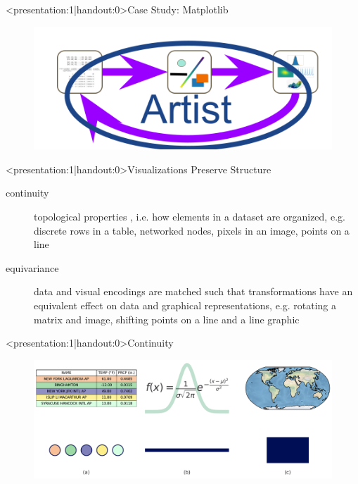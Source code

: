 \documentclass[xcolor={dvipsnames}, handout]{beamer}
\begin{document}
\begin{frame}<presentation:1|handout:0>{Case Study: Matplotlib}
    \begin{figure}
       \includegraphics[width=\linewidth]{figures/flow/artists.png}
    \end{figure}
\end{frame}

\begin{frame}<presentation:1|handout:0>{Visualizations Preserve Structure}
    \begin{description}
        \item [continuity] topological properties \cite{wilkinsonGrammarGraphics2005}, i.e. how elements in a dataset are organized, e.g. discrete rows in a table, networked nodes, pixels in an image, points on a line
        \item [equivariance] data and visual encodings are matched such that transformations have an equivalent effect on data and graphical representations, e.g. rotating a matrix and image, shifting  points on a line and a line graphic
      \end{description}
\end{frame}

\begin{frame}<presentation:1|handout:0>{Continuity}
    \begin{figure}
        \includegraphics[width=\linewidth]{../paper/figures/k_different_types.png}
    \end{figure}
\end{frame}
\end{document}
